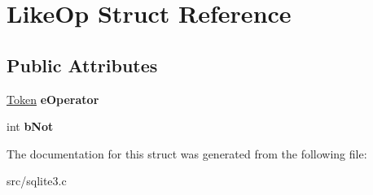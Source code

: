 \hypertarget{struct_like_op}{\section{Like\-Op Struct Reference}
\label{struct_like_op}
}
\subsection*{Public Attributes}
\begin{DoxyCompactItemize}
\item 
\hypertarget{struct_like_op_a02dccb0eea9610285333434a755acae8}{\hyperlink{struct_token}{Token} {\bfseries e\-Operator}}\label{struct_like_op_a02dccb0eea9610285333434a755acae8}

\item 
\hypertarget{struct_like_op_a09daccf65c917f32e8b60b347e8893cf}{int {\bfseries b\-Not}}\label{struct_like_op_a09daccf65c917f32e8b60b347e8893cf}

\end{DoxyCompactItemize}


The documentation for this struct was generated from the following file\-:\begin{DoxyCompactItemize}
\item 
src/sqlite3.\-c\end{DoxyCompactItemize}
